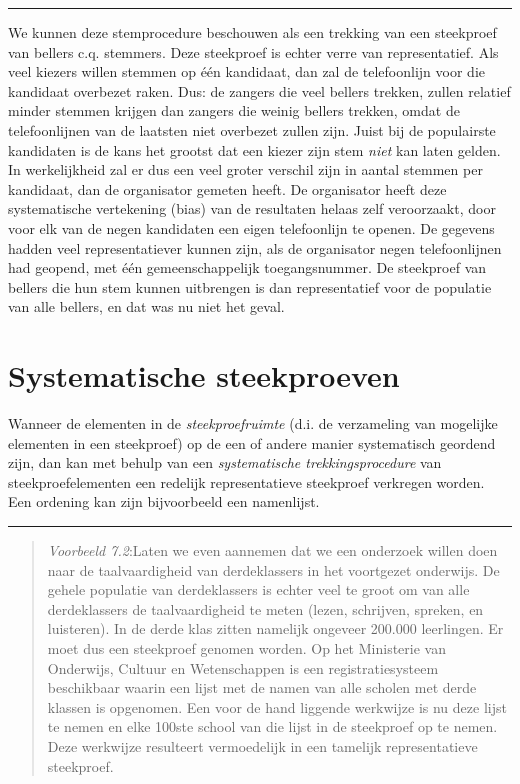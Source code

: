 \documentclass[
]{book}
\begin{document}
\begin{center}\rule{0.5\linewidth}{0.5pt}\end{center}

We kunnen deze stemprocedure beschouwen als een trekking van een
steekproef van bellers c.q. stemmers. Deze steekproef is echter verre
van representatief. Als veel kiezers willen stemmen op één kandidaat,
dan zal de telefoonlijn voor die kandidaat overbezet raken. Dus: de
zangers die veel bellers trekken, zullen relatief minder stemmen krijgen
dan zangers die weinig bellers trekken, omdat de telefoonlijnen van de
laatsten niet overbezet zullen zijn. Juist bij de populairste kandidaten
is de kans het grootst dat een kiezer zijn stem \emph{niet} kan laten gelden.
In werkelijkheid zal er dus een veel groter verschil zijn in aantal
stemmen per kandidaat, dan de organisator gemeten heeft. De organisator
heeft deze systematische vertekening (bias) van de resultaten helaas
zelf veroorzaakt, door voor elk van de negen kandidaten een eigen
telefoonlijn te openen. De gegevens hadden veel representatiever kunnen
zijn, als de organisator negen telefoonlijnen had geopend, met één
gemeenschappelijk toegangsnummer. De steekproef van bellers die hun stem
kunnen uitbrengen is dan representatief voor de populatie van alle
bellers, en dat was nu niet het geval.

\hypertarget{sec:systematischesteekproef}{%
\section{Systematische steekproeven}\label{sec:systematischesteekproef}}

Wanneer de elementen in de \emph{steekproefruimte} (d.i. de verzameling van
mogelijke elementen in een steekproef) op de een of andere manier
systematisch geordend zijn, dan kan met behulp van een \emph{systematische
trekkingsprocedure} van steekproefelementen een redelijk representatieve
steekproef verkregen worden. Een ordening kan zijn bijvoorbeeld een
namenlijst.

\begin{center}\rule{0.5\linewidth}{0.5pt}\end{center}

\begin{quote}
\emph{Voorbeeld 7.2}:Laten we even aannemen dat we een onderzoek willen doen naar de
taalvaardigheid van derdeklassers in het voortgezet onderwijs. De gehele
populatie van derdeklassers is echter veel te groot om van alle
derdeklassers de taalvaardigheid te meten (lezen, schrijven, spreken, en
luisteren). In de derde klas zitten namelijk ongeveer 200.000
leerlingen. Er moet dus een steekproef genomen worden. Op het Ministerie
van Onderwijs, Cultuur en Wetenschappen is een registratiesysteem
beschikbaar waarin een lijst met de namen van alle scholen met derde
klassen is opgenomen. Een voor de hand liggende werkwijze is nu deze
lijst te nemen en elke 100ste school van die lijst in de steekproef op
te nemen. Deze werkwijze resulteert vermoedelijk in een tamelijk
representatieve steekproef.
\end{quote}
\end{document}
